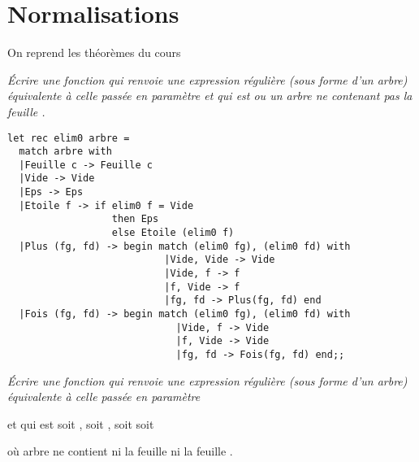 \section{Normalisations}
On reprend les théorèmes du cours
\begin{Exercise}
{\it Écrire une fonction  qui renvoie une expression régulière (sous forme d'un arbre) équivalente à celle passée en paramètre et qui est  ou un arbre ne contenant pas la feuille .}
\end{Exercise}
\begin{Answer}
\begin{lstlisting}
let rec elim0 arbre = 
  match arbre with
  |Feuille c -> Feuille c
  |Vide -> Vide
  |Eps -> Eps
  |Etoile f -> if elim0 f = Vide
                  then Eps
                  else Etoile (elim0 f)
  |Plus (fg, fd) -> begin match (elim0 fg), (elim0 fd) with
                           |Vide, Vide -> Vide
                           |Vide, f -> f
                           |f, Vide -> f
                           |fg, fd -> Plus(fg, fd) end
  |Fois (fg, fd) -> begin match (elim0 fg), (elim0 fd) with
                             |Vide, f -> Vide
                             |f, Vide -> Vide
                             |fg, fd -> Fois(fg, fd) end;;
\end{lstlisting}
\end{Answer}
\begin{Exercise}
{\it Écrire une fonction  qui renvoie une expression régulière (sous forme d'un arbre) équivalente à celle passée en paramètre 

et qui est soit , soit , soit  soit  

où arbre ne contient ni la feuille  ni la feuille .}
\end{Exercise}
